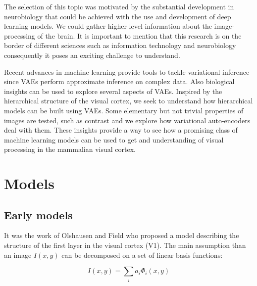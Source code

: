 \documentclass[12pt, english]{article}
\begin{document}
\vspace{7mm}

\par The selection of this topic was motivated by the substantial development in neurobiology that could be achieved with the use and development of deep learning models. We could gather higher level information about the image-processing of the brain. It is important to mention that this research is on the border of different sciences such as information technology and neurobiology consequently it poses an exciting challenge to understand.

\vspace{4mm}

\par Recent advances in machine learning provide tools to tackle variational inference since VAEs perform approximate inference on complex data. Also biological insights can be used to explore several aspects of VAEs. Inspired by the hierarchical structure of the visual cortex, we seek to understand how hierarchical models can be built using VAEs. Some elementary but not trivial properties of images are tested, such as contrast and we explore how variational auto-encoders deal with them. These insights provide a way to see how a promising class of machine learning models can be used to get and understanding of visual processing in the mammalian visual cortex.

\newpage

\section{Models}

\vspace{7mm}

\subsection{Early models}

\vspace{5mm}

\par It was the work of Olshausen and Field \cite{olshausen1996emergence} who proposed a model describing the structure of the first layer in the visual cortex (V1). The main assumption than an image $I(x, y)$ can be decomposed on a set of linear basis functions:

\vspace{4mm}

\begin{equation}
    I(x, y) = \sum_{i}a_i \Phi_{i}(x, y)
\end{equation}
\end{document}
